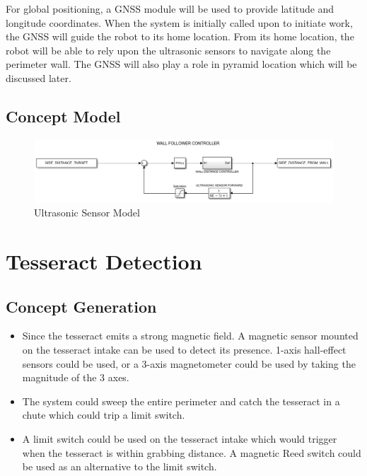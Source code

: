 \documentclass[12pt]{article}
\begin{document}
For global positioning, a GNSS module will be used to provide latitude and longitude coordinates. When the system is initially called upon to initiate work, the GNSS will guide the robot to its home location. From its home location, the robot will be able to rely upon the ultrasonic sensors to navigate along the perimeter wall. The GNSS will also play a role in pyramid location which will be discussed later. 


\subsection{Concept Model}
\begin{figure}[htb!]
\begin{center}
\caption{Ultrasonic Sensor Model}
\includegraphics[scale=0.6]{Figures/simulink_ultrasonic}
\end{center}
\end{figure}
\FloatBarrier

\vspace*{-\baselineskip}
\section{Tesseract Detection}
\subsection{Concept Generation}
\begin{itemize}
\item Since the tesseract emits a strong magnetic field. A magnetic sensor mounted on the tesseract intake can be used to detect its presence. 1-axis hall-effect sensors could be used, or a 3-axis magnetometer could be used by taking the magnitude of the 3 axes.

\item The system could sweep the entire perimeter and catch the tesseract in a chute which could trip a limit switch.

\item A limit switch could be used on the tesseract intake which would trigger when the tesseract is within grabbing distance. A magnetic Reed switch could be used as an alternative to the limit switch.
\end{itemize}
\end{document}
